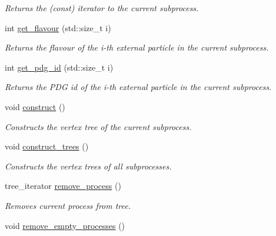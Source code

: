 \begin{DoxyCompactItemize}
\begin{DoxyCompactList}\small\item\em Returns the (const) iterator to the current subprocess. \end{DoxyCompactList}\item 
int \hyperlink{a00070_ad32142d2aeaa4c7cb48a59bf349bf974}{get\-\_\-flavour} (std\-::size\-\_\-t i)
\begin{DoxyCompactList}\small\item\em Returns the flavour of the i-\/th external particle in the current subprocess. \end{DoxyCompactList}\item 
int \hyperlink{a00070_a039e963e04dd2b56d3b3e954a785578f}{get\-\_\-pdg\-\_\-id} (std\-::size\-\_\-t i)
\begin{DoxyCompactList}\small\item\em Returns the P\-D\-G id of the i-\/th external particle in the current subprocess. \end{DoxyCompactList}\item 
\hypertarget{a00070_a000312e3e3674c447dd4335750900c93}{void \hyperlink{a00070_a000312e3e3674c447dd4335750900c93}{construct} ()}\label{a00070_a000312e3e3674c447dd4335750900c93}

\begin{DoxyCompactList}\small\item\em Constructs the vertex tree of the current subprocess. \end{DoxyCompactList}\item 
\hypertarget{a00070_a456f4c9ded09ed96900fd9db353a8347}{void \hyperlink{a00070_a456f4c9ded09ed96900fd9db353a8347}{construct\-\_\-trees} ()}\label{a00070_a456f4c9ded09ed96900fd9db353a8347}

\begin{DoxyCompactList}\small\item\em Constructs the vertex trees of all subprocesses. \end{DoxyCompactList}\item 
\hypertarget{a00070_a3315137e5b3d94680862d712d7a473e9}{tree\-\_\-iterator \hyperlink{a00070_a3315137e5b3d94680862d712d7a473e9}{remove\-\_\-process} ()}\label{a00070_a3315137e5b3d94680862d712d7a473e9}

\begin{DoxyCompactList}\small\item\em Removes current process from tree. \end{DoxyCompactList}\item 
\hypertarget{a00070_aaadcc4fc3d87aefaf15fa868e4bb9b62}{void \hyperlink{a00070_aaadcc4fc3d87aefaf15fa868e4bb9b62}{remove\-\_\-empty\-\_\-processes} ()}\label{a00070_aaadcc4fc3d87aefaf15fa868e4bb9b62}


\end{DoxyCompactItemize}
